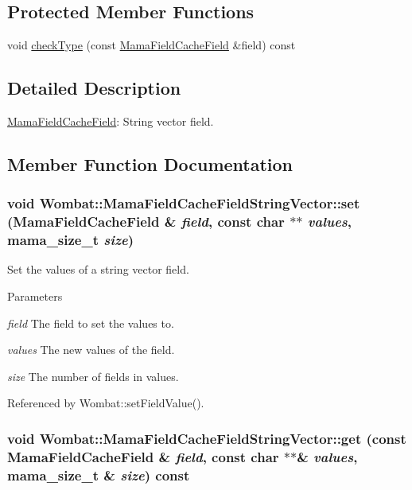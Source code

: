 \subsection*{Protected Member Functions}
\begin{DoxyCompactItemize}
\item 
void \hyperlink{classWombat_1_1MamaFieldCacheFieldStringVector_a56939657fa81200b01a8c93a002b22a7}{checkType} (const \hyperlink{classWombat_1_1MamaFieldCacheField}{MamaFieldCacheField} \&field) const 
\end{DoxyCompactItemize}


\subsection{Detailed Description}
\hyperlink{classWombat_1_1MamaFieldCacheField}{MamaFieldCacheField}: String vector field. 

\subsection{Member Function Documentation}
\hypertarget{classWombat_1_1MamaFieldCacheFieldStringVector_abb302eb54186f9e5d002e80595eb713f}{
\subsubsection[{set}]{\setlength{\rightskip}{0pt plus 5cm}void Wombat::MamaFieldCacheFieldStringVector::set ({\bf MamaFieldCacheField} \& {\em field}, \/  const char $\ast$$\ast$ {\em values}, \/  {\bf mama\_\-size\_\-t} {\em size})}}
\label{classWombat_1_1MamaFieldCacheFieldStringVector_abb302eb54186f9e5d002e80595eb713f}


Set the values of a string vector field. 
\begin{DoxyParams}{Parameters}
\item[{\em field}]The field to set the values to. \item[{\em values}]The new values of the field. \item[{\em size}]The number of fields in {\ttfamily values}. \end{DoxyParams}


Referenced by Wombat::setFieldValue().\hypertarget{classWombat_1_1MamaFieldCacheFieldStringVector_a030ee37c78f1e4a5201aa27802efb849}{
\subsubsection[{get}]{\setlength{\rightskip}{0pt plus 5cm}void Wombat::MamaFieldCacheFieldStringVector::get (const {\bf MamaFieldCacheField} \& {\em field}, \/  const char $\ast$$\ast$\& {\em values}, \/  {\bf mama\_\-size\_\-t} \& {\em size}) const}}
\label{classWombat_1_1MamaFieldCacheFieldStringVector_a030ee37c78f1e4a5201aa27802efb849}


